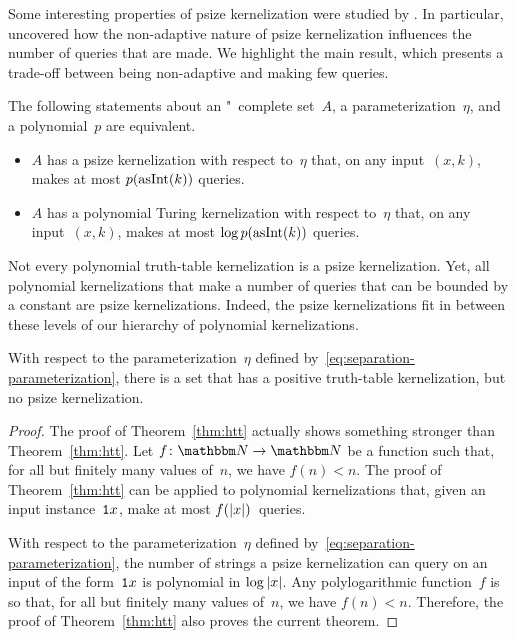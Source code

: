 Some interesting properties of psize kernelization were studied by \textcite[Chapter~5]{weller2013aspects}.
In particular, \citeauthor{weller2013aspects} uncovered how the non-adaptive nature of psize kernelization influences the number of queries that are made.
We highlight the main result, which presents a trade-off between being non-adaptive and making few queries.
\begin{theorem}
  The following statements about an "~complete set~$A$, a parameterization~$\eta$, and a polynomial~$p$ are equivalent.
  \begin{itemize}
  \item
    $A$ has a psize kernelization with respect to~$\eta$ that, on any input~$(x, k)$, makes at most $p(\operatorname{asInt}(k))$ queries.
  \item
    $A$ has a polynomial Turing kernelization with respect to~$\eta$ that, on any input~$(x, k)$, makes at most $\log p(\operatorname{asInt}(k))$ queries.
  \end{itemize}
\end{theorem}

Not every polynomial truth-table kernelization is a psize kernelization.
Yet, all polynomial kernelizations that make a number of queries that can be bounded by a constant are psize kernelizations.
Indeed, the psize kernelizations fit in between these levels of our hierarchy of polynomial kernelizations.

\begin{theorem}
\label{thm:htt_psize}%
  With respect to the parameterization~$\eta$ defined by~\eqref{eq:separation-parameterization}, there is a set that has a positive truth-table kernelization, but no psize kernelization.
\end{theorem}
\begin{proof}
  The proof of Theorem~\ref{thm:htt} actually shows something stronger than Theorem~\ref{thm:htt}.
  Let $f\colon \bbN \to \bbN$ be a function such that, for all but finitely many values of~$n$, we have $f(n) < n$.
  The proof of Theorem~\ref{thm:htt} can be applied to polynomial kernelizations that, given an input instance~$\textnormal{\texttt{1}}x$, make at most $f({\lvert x\rvert})$~queries.

  With respect to the parameterization~$\eta$ defined by~\eqref{eq:separation-parameterization}, the number of strings a psize kernelization can query on an input of the form~$\textnormal{\texttt{1}}x$ is polynomial in $\log {\lvert x\rvert}$.
  Any polylogarithmic function~$f$ is so that, for all but finitely many values of~$n$, we have $f(n) < n$.
  Therefore, the proof of Theorem~\ref{thm:htt} also proves the current theorem.
\end{proof}

